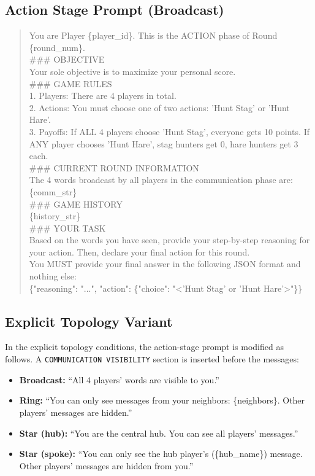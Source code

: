 \subsection{Action Stage Prompt (Broadcast)}\label{app:prompt-action}

\begin{quote}
\small\ttfamily
You are Player \{player\_id\}. This is the ACTION phase of Round \{round\_num\}.\\[4pt]
\#\#\# OBJECTIVE\\
Your sole objective is to maximize your personal score.\\[4pt]
\#\#\# GAME RULES\\
1. Players: There are 4 players in total.\\
2. Actions: You must choose one of two actions: 'Hunt Stag' or 'Hunt Hare'.\\
3. Payoffs: If ALL 4 players choose 'Hunt Stag', everyone gets 10 points. If ANY player chooses 'Hunt Hare', stag hunters get 0, hare hunters get 3 each.\\[4pt]
\#\#\# CURRENT ROUND INFORMATION\\
The 4 words broadcast by all players in the communication phase are:\\
\{comm\_str\}\\[4pt]
\#\#\# GAME HISTORY\\
\{history\_str\}\\[4pt]
\#\#\# YOUR TASK\\
Based on the words you have seen, provide your step-by-step reasoning for your action. Then, declare your final action for this round.\\[4pt]
You MUST provide your final answer in the following JSON format and nothing else:\\
\{"reasoning": "...", "action": \{"choice": "<'Hunt Stag' or 'Hunt Hare'>"\}\}
\end{quote}

\subsection{Explicit Topology Variant}\label{app:prompt-topology}

In the explicit topology conditions, the action-stage prompt is modified as follows.
A \texttt{COMMUNICATION VISIBILITY} section is inserted before the messages:

\begin{itemize}
\item \textbf{Broadcast:} ``All 4 players' words are visible to you.''
\item \textbf{Ring:} ``You can only see messages from your neighbors: \{neighbors\}. Other players' messages are hidden.''
\item \textbf{Star (hub):} ``You are the central hub. You can see all players' messages.''
\item \textbf{Star (spoke):} ``You can only see the hub player's (\{hub\_name\}) message. Other players' messages are hidden from you.''
\end{itemize}

